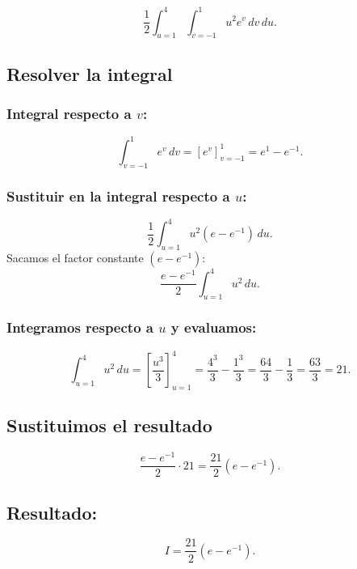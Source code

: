 \[
\frac{1}{2} \int_{u=1}^{4} \int_{v=-1}^{1} u^2 e^v \, dv \, du.
\]

\subsection*{Resolver la integral}
\subsubsection*{Integral respecto a \( v \):}
\[
\int_{v=-1}^1 e^v \, dv = \left[ e^v \right]_{v=-1}^1 = e^1 - e^{-1}.
\]

\subsubsection*{Sustituir en la integral respecto a \( u \):}
\[
\frac{1}{2} \int_{u=1}^{4} u^2 (e - e^{-1}) \, du.
\]
Sacamos el factor constante \( (e - e^{-1}) \):
\[
\frac{e - e^{-1}}{2} \int_{u=1}^{4} u^2 \, du.
\]

\subsubsection*{Integramos respecto a \( u \) y evaluamos:}
\[
\int_{u=1}^{4} u^2 \, du = \left[ \frac{u^3}{3} \right]_{u=1}^{4} = \frac{4^3}{3} - \frac{1^3}{3} = \frac{64}{3} - \frac{1}{3} = \frac{63}{3} = 21.
\]

\subsection*{Sustituimos el resultado}
\[
\frac{e - e^{-1}}{2} \cdot 21 = \frac{21}{2} (e - e^{-1}).
\]

\subsection*{Resultado:}
\[
\boxed{I = \frac{21}{2} (e - e^{-1})}.
\]